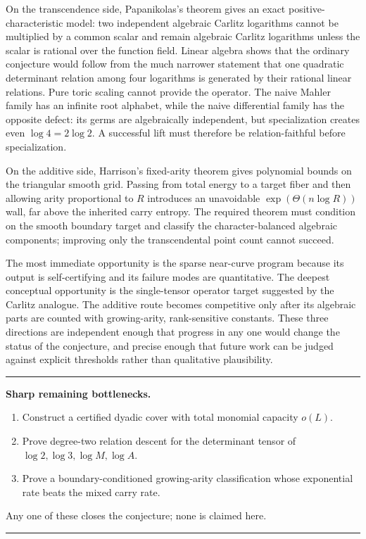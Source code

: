 \documentclass[11pt,oneside]{article}
\theoremstyle{definition}
\theoremstyle{remark}
\newenvironment{resultbox}
{\begin{center}\begin{minipage}{0.95\textwidth}\hrule\vspace{0.5em}}
{\vspace{0.45em}\hrule\end{minipage}\end{center}}
\begin{document}
On the transcendence side, Papanikolas's theorem gives an exact positive-characteristic model:
two independent algebraic Carlitz logarithms cannot be multiplied by a common scalar and remain
algebraic Carlitz logarithms unless the scalar is rational over the function field.  Linear algebra
shows that the ordinary conjecture would follow from the much narrower statement that one
quadratic determinant relation among four logarithms is generated by their rational linear
relations.  Pure toric scaling cannot provide the operator.  The naive Mahler family has an
infinite root alphabet, while the naive differential family has the opposite defect: its germs are
algebraically independent, but specialization creates even $\log4=2\log2$.  A successful lift must
therefore be relation-faithful before specialization.

On the additive side, Harrison's fixed-arity theorem gives polynomial bounds on the triangular
smooth grid.  Passing from total energy to a target fiber and then allowing arity proportional to
$R$ introduces an unavoidable $\exp(\Theta(n\log R))$ wall, far above the inherited carry entropy.
The required theorem must condition on the smooth boundary target and classify the
character-balanced algebraic components; improving only the transcendental point count cannot
succeed.

The most immediate opportunity is the sparse near-curve program because its output is
self-certifying and its failure modes are quantitative.  The deepest conceptual opportunity is the
single-tensor operator target suggested by the Carlitz analogue.  The additive route becomes
competitive only after its algebraic parts are counted with growing-arity, rank-sensitive
constants.  These three directions are independent enough that progress in any one would change
the status of the conjecture, and precise enough that future work can be judged against explicit
thresholds rather than qualitative plausibility.

\begin{resultbox}
\textbf{Sharp remaining bottlenecks.}
\begin{enumerate}
\item Construct a certified dyadic cover with total monomial capacity $o(L)$.
\item Prove degree-two relation descent for the determinant tensor of
$\log2,\log3,\log M,\log A$.
\item Prove a boundary-conditioned growing-arity classification whose exponential rate beats the
mixed carry rate.
\end{enumerate}
Any one of these closes the conjecture; none is claimed here.
\end{resultbox}
\end{document}
